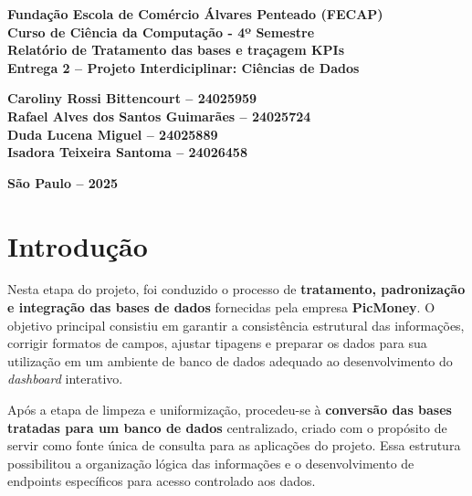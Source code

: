 \documentclass[12pt]{article}
\begin{document}

\begin{center}
\textbf{Fundação Escola de Comércio Álvares Penteado (FECAP)}\\
\textbf{Curso de Ciência da Computação - 4º Semestre}\\[2cm]

\vspace*{\fill}
\textbf{\Large Relatório de Tratamento das bases e traçagem KPIs}\\[0.5cm]
\textbf{Entrega 2 – Projeto Interdiciplinar: Ciências de Dados}\\[2cm]
\end{center}

\noindent\hspace*{6cm}\textbf{Caroliny Rossi Bittencourt – 24025959}\\
\hspace*{6cm}\textbf{Rafael Alves dos Santos Guimarães – 24025724}\\
\hspace*{6cm}\textbf{Duda Lucena Miguel – 24025889}\\
\hspace*{6cm}\textbf{Isadora Teixeira Santoma – 24026458}\\[2cm]

\vspace*{\fill}
\begin{center}
\vfill
\textbf{São Paulo – 2025}
\end{center}
\newpage
\onehalfspacing

\section{Introdução}

Nesta etapa do projeto, foi conduzido o processo de \textbf{tratamento, padronização e integração das bases de dados} fornecidas pela empresa \textbf{PicMoney}. O objetivo principal consistiu em garantir a consistência estrutural das informações, corrigir formatos de campos, ajustar tipagens e preparar os dados para sua utilização em um ambiente de banco de dados adequado ao desenvolvimento do \textit{dashboard} interativo.

Após a etapa de limpeza e uniformização, procedeu-se à \textbf{conversão das bases tratadas para um banco de dados} centralizado, criado com o propósito de servir como fonte única de consulta para as aplicações do projeto. Essa estrutura possibilitou a organização lógica das informações e o desenvolvimento de endpoints específicos para acesso controlado aos dados.
\end{document}
